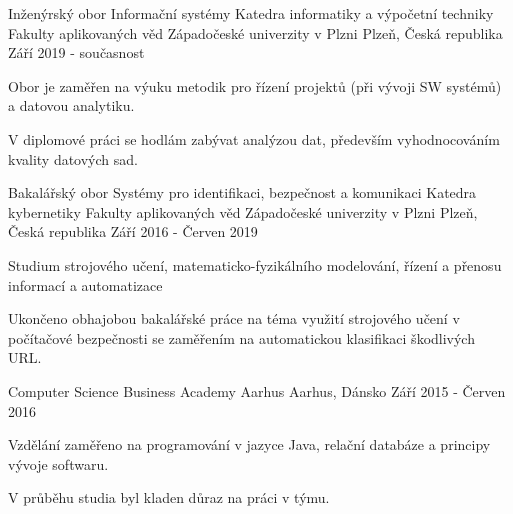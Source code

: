 

\begin{cventries}

    \cventry
    {Inženýrský obor Informační systémy} %
    {Katedra informatiky a výpočetní techniky Fakulty aplikovaných věd Západočeské univerzity v Plzni} %
    {Plzeň, Česká republika} %
    {Září 2019 - současnost} %
    {
      \begin{cvitems} %
        \item {Obor je zaměřen na výuku metodik pro řízení projektů (při vývoji SW systémů) a datovou analytiku.}
        \item {V diplomové práci se hodlám zabývat analýzou dat, především vyhodnocováním kvality datových sad.}
      \end{cvitems}
    }

    \cventry
    {Bakalářský obor Systémy pro identifikaci, bezpečnost a komunikaci} %
    {Katedra kybernetiky Fakulty aplikovaných věd Západočeské univerzity v Plzni} %
    {Plzeň, Česká republika} %
    {Září 2016 - Červen 2019} %
    {
      \begin{cvitems} %
        \item {Studium strojového učení, matematicko-fyzikálního modelování, řízení a přenosu informací a automatizace}
        \item {Ukončeno obhajobou bakalářské práce na téma využití strojového učení v počítačové bezpečnosti se zaměřením na automatickou klasifikaci škodlivých URL.}
      \end{cvitems}
    }

    \cventry
    {Computer Science}
    {Business Academy Aarhus}
    {Aarhus, Dánsko}
    {Září 2015 - Červen 2016}
    {
      \begin{cvitems}
        \item {Vzdělání zaměřeno na programování v jazyce Java, relační databáze a principy vývoje softwaru.}
        \item {V průběhu studia byl kladen důraz na práci v týmu.}
      \end{cvitems}
    }


\end{cventries}

